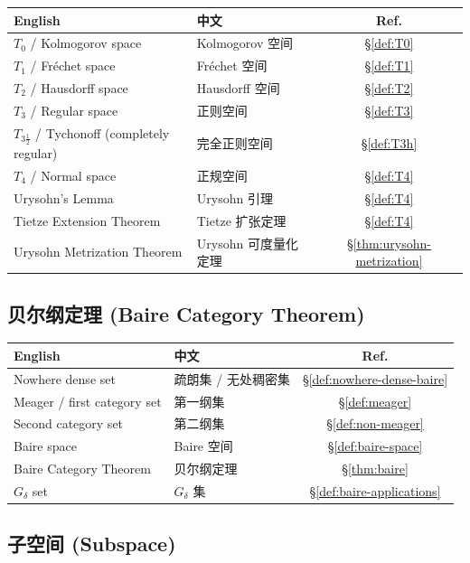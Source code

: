 \documentclass{article}
\begin{document}
\begin{tabular}{@{}lp{7.5cm}c@{}}
  \hline
  \textbf{English} & \textbf{中文} & \textbf{Ref.} \\
  \hline
  $T_0$ / Kolmogorov space         & Kolmogorov 空间 & \S\ref{def:T0} \\
  $T_1$ / Fr\'echet space          & Fr\'echet 空间 & \S\ref{def:T1} \\
  $T_2$ / Hausdorff space          & Hausdorff 空间 & \S\ref{def:T2} \\
  $T_3$ / Regular space            & 正则空间 & \S\ref{def:T3} \\
  $T_{3\frac{1}{2}}$ / Tychonoff (completely regular) & 完全正则空间 &
  \S\ref{def:T3h} \\
  $T_4$ / Normal space             & 正规空间 & \S\ref{def:T4} \\
  Urysohn's Lemma                  & Urysohn 引理 & \S\ref{def:T4} \\
  Tietze Extension Theorem         & Tietze 扩张定理 & \S\ref{def:T4} \\
  Urysohn Metrization Theorem      & Urysohn 可度量化定理 &
  \S\ref{thm:urysohn-metrization} \\
  \hline
\end{tabular}

\subsection*{贝尔纲定理 (Baire Category Theorem)}

\begin{tabular}{@{}lp{7.5cm}c@{}}
  \hline
  \textbf{English} & \textbf{中文} & \textbf{Ref.} \\
  \hline
  Nowhere dense set                & 疏朗集 / 无处稠密集 &
  \S\ref{def:nowhere-dense-baire} \\
  Meager / first category set      & 第一纲集 & \S\ref{def:meager} \\
  Second category set              & 第二纲集 & \S\ref{def:non-meager} \\
  Baire space                      & Baire 空间 & \S\ref{def:baire-space} \\
  Baire Category Theorem           & 贝尔纲定理 & \S\ref{thm:baire} \\
  $G_\delta$ set                   & $G_\delta$ 集 &
  \S\ref{def:baire-applications} \\
  \hline
\end{tabular}

\subsection*{子空间 (Subspace)}
\end{document}
